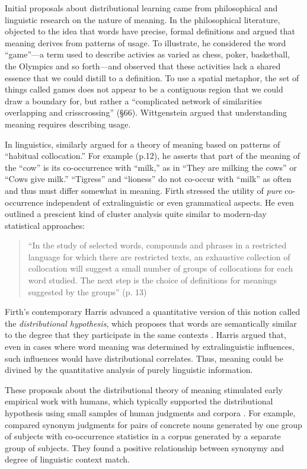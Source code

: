 \documentclass[man,floatsintext]{apa6}
\begin{document}
Initial proposals about distributional learning came from philosophical and linguistic research on the nature of meaning. In the philosophical literature, \citet{wittgenstein1953} objected to the idea that words have precise, formal definitions and argued that meaning derives from patterns of usage. To illustrate, he considered the word ``game''---a term used to describe activies as varied as chess, poker, basketball, the Olympics and so forth---and observed that these activities lack a shared essence that we could distill to a definition. To use a spatial metaphor, the set of things called games does not appear to be a contiguous region that we could draw a boundary for, but rather a ``complicated network of similarities overlapping and crisscrossing'' (\S 66). Wittgenstein argued that understanding meaning requires describing usage.

In linguistics, \citet{firth1957} similarly argued for a theory of meaning based on patterns of ``habitual collocation.'' For example (p.12), he asserts that part of the meaning of the ``cow'' is its co-occurrence with  ``milk,'' as in ``They are milking the cows'' or ``Cows give milk.'' ``Tigress'' and ``lioness'' do not co-occur with ``milk'' as often and thus must differ somewhat in meaning. Firth stressed the utility of \emph{pure} co-occurrence independent of extralinguistic or even grammatical aspects. He even outlined a prescient kind of cluster analysis quite similar to modern-day statistical approaches:

\begin{quote}
``In the study of selected words, compounds and phrases in a restricted language for which there are restricted texts, an exhaustive collection of collocation will suggest a small number of groups of collocations for each word studied. The next step is the choice of definitions for meanings suggested by the groups'' (p. 13)
\end{quote}

Firth's contemporary Harris advanced a quantitative version of this notion called the \emph{distributional hypothesis}, which proposes that words are semantically similar to the degree that they participate in the same contexts \citep{harris1951}. Harris argued that, even in cases where word meaning was determined by extralinguistic influences, such influences would have distributional correlates. Thus, meaning could be divined by the quantitative analysis of purely linguistic information.

These proposals about the distributional theory of meaning stimulated early empirical work with humans, which typically supported the distributional hypothesis using small samples of human judgments and corpora \citep{rubenstein1965, clark1968, stefflre1971, geffroy1973, berryrogghe1973, szalay1974}. For example, \citet{rubenstein1965} compared synonym judgments for pairs of concrete nouns generated by one group of subjects with co-occurrence statistics in a corpus generated by a separate group of subjects. They found a positive relationship between synonymy and degree of linguistic context match.
\end{document}

